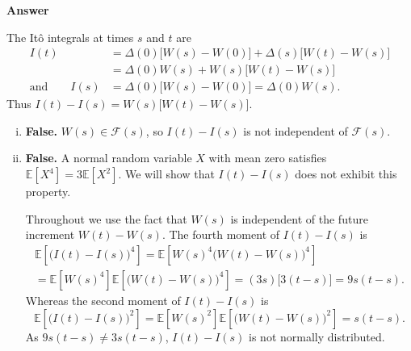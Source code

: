 \documentclass[11pt]{article}
\newcommand\E{\mathbb{E}}
\newcommand\cF{\mathcal{F}}
\newenvironment{hwanswer}
    {
        \vspace{2mm}
        {\bfseries Answer}
        \vspace{-\abovedisplayskip}
        \begin{center}
            \begin{tcolorbox}[
                width=0.95\textwidth,
                colback=white,
                colframe=white,
                opacityback=0,
                opacityframe=0,
                boxrule=0pt,
                frame hidden,
                breakable,
                before upper={\parindent15pt} %
            ]
            \lineskip=0pt %
    }
    {
        \end{tcolorbox}
        \end{center}
        \vspace{4mm}
    }
\begin{document}
    \begin{hwanswer}
        The It\^{o} integrals at times $s$ and $t$ are
        \[
            \begin{aligned}
                I(t)
                &=
                \Delta(0) \big[ W(s) - W(0) \big]
                +
                \Delta(s) \big[ W(t) - W(s) \big]
                \\
                &=
                \Delta(0) W(s)
                +
                W(s) \big[ W(t) - W(s) \big]
                \\
                \text{and} \qquad
                I(s)
                &=
                \Delta(0) \big[ W(s) - W(0) \big]
                =
                \Delta(0) W(s).
            \end{aligned}
        \]
        Thus $I(t) - I(s) = W(s)\big[ W(t) - W(s) \big]$.

        \vspace{2mm}

        \begin{enumerate}[(i)]
            \item {\bfseries False.} $W(s) \in \cF(s)$, so $I(t) - I(s)$ is not independent
            of $\cF(s)$.

            \item {\bfseries False.} A normal random variable $X$ with mean zero satisfies
            $\E[X^4] = 3 \E[X^2]$. We will show that $I(t) - I(s)$ does not exhibit this
            property.

            Throughout we use the fact that $W(s)$ is independent of the future increment
            $W(t) - W(s)$. The fourth moment of $I(t) - I(s)$ is
            \[
                \begin{multlined}
                    \E\left[
                        \big(I(t) - I(s)\big)^4
                    \right]
                    =
                    \E\left[
                        W(s)^4 \big(W(t) - W(s)\big)^4
                    \right]
                    \\
                    =
                    \E\left[
                        W(s)^4
                    \right]
                    \E\left[
                        \big(W(t) - W(s)\big)^4
                    \right]
                    =
                    ( 3 s ) \big[ 3(t - s) \big]
                    =
                    9 s(t - s).
                \end{multlined}
            \]
            Whereas the second moment of $I(t) - I(s)$ is
            \[
                \E\left[
                    \big( I(t) - I(s) \big)^2
                \right]
                =
                \E\left[
                    W(s)^2
                \right]
                \E\left[
                    \big(W(t) - W(s)\big)^2
                \right]
                =
                s (t - s).
            \]
            As $9 s (t - s) \neq 3 s (t - s)$, $I(t) - I(s)$ is not normally distributed.


\end{enumerate}
\end{hwanswer}
\end{document}
